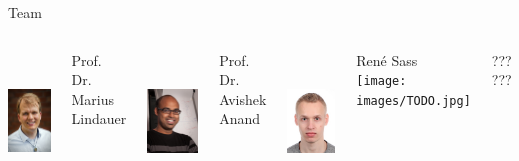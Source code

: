 \documentclass[aspectratio=169]{../latex_main/tntbeamer}  %
\begin{document}
\begin{frame}[c]{Team}

\begin{columns}[T]

\centering
\includegraphics[height=10em]{./figures/marius_lindauer_small}

Prof. Dr.\\ Marius Lindauer

\centering
\includegraphics[height=10em]{./figures/avishek-homepage}

Prof. Dr.\\ Avishek Anand

\centering
\includegraphics[height=10em]{./figures/rene_sass}

Ren\'e Sass\\

\centering
\texttt{[image: images/TODO.jpg]}

??? ???\\

\end{columns}

\end{frame}
\end{document}
